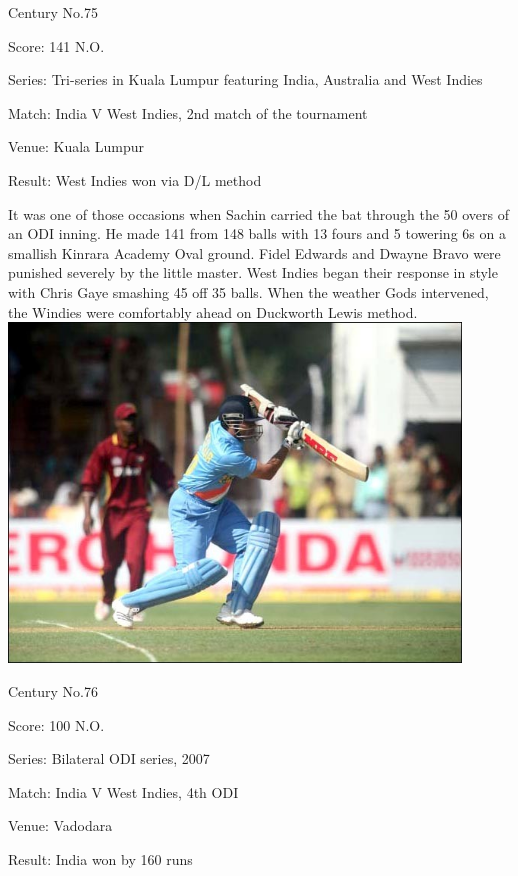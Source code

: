 \documentclass[11pt, a4paper]{article}
\begin{document}
Century No.75 

Score: 141 N.O. 

Series: Tri-series in Kuala Lumpur featuring India, Australia and West Indies 

Match: India V West Indies, 2nd match of the tournament 

Venue: Kuala Lumpur 

Result: West Indies won via D/L method 

It was one of those occasions when Sachin carried the bat through the 50 overs of an ODI inning. He made 141 from 148 balls with 13 fours and 5 towering 6s on a smallish Kinrara Academy Oval ground. Fidel Edwards and Dwayne Bravo were punished severely by the little master. West Indies began their response in style with Chris Gaye smashing 45 off 35 balls. When the weather Gods intervened, the Windies were comfortably ahead on Duckworth Lewis method.
\newpage
\includegraphics[width=0.9\textwidth]{pics/76.jpg}

Century No.76 

Score: 100 N.O. 

Series: Bilateral ODI series, 2007 

Match: India V West Indies, 4th ODI 

Venue: Vadodara 

Result: India won by 160 runs 
\end{document}
